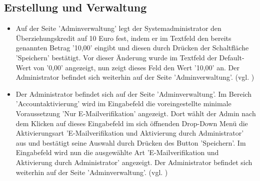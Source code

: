 \documentclass[a4paper]{scrreprt}
\begin{document}
		\subsection{Erstellung und Verwaltung}
			\begin{itemize}
				\item {} 
				 Auf der Seite 'Adminverwaltung' legt der Systemadministrator den Überziehungskredit auf 10 Euro fest, indem er im Textfeld den bereits genannten Betrag '10,00' eingibt und diesen durch Drücken der Schaltfläche 'Speichern' bestätigt. Vor dieser Änderung wurde im Textfeld der Default-Wert von '0,00' angezeigt, nun zeigt dieses Feld den Wert '10,00' an. Der Administrator befindet sich weiterhin auf der Seite 'Adminverwaltung'. (vgl. )
				
				\item {}
				 Der Administrator befindet sich auf der Seite 'Adminverwaltung'. Im Bereich 'Accountaktivierung' wird im Eingabefeld die voreingestellte minimale Voraussetzung 'Nur E-Mailverifikation' angezeigt. Dort wählt der Admin nach dem Klicken auf dieses Eingabefeld im sich öffnenden Drop-Down Menü die Aktivierungsart 'E-Mailverifikation und Aktivierung durch Administrator' aus und bestätigt seine Auswahl durch Drücken des Button 'Speichern'. Im Eingabefeld wird nun die ausgewählte Art 'E-Mailverifikation und Aktivierung durch Administrator' angezeigt. Der Administrator befindet sich weiterhin auf der Seite 'Adminverwaltung'. (vgl. )
				

\end{itemize}
\end{document}
